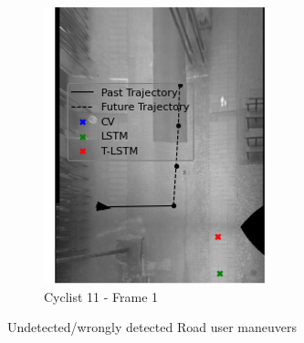 \documentclass{article}
\begin{document}
\begin{figure}[H]
\begin{subfigure}{0.40\textwidth}
  \includegraphics[width=\linewidth]{quali_results/cyc-11.png}
  \caption{Cyclist 11 - Frame 1}
  \label{fig:cyc11}
\end{subfigure}
\caption{Undetected/wrongly detected Road user maneuvers }
\label{fig:fails}
\end{figure}










\printbibliography %
\end{document}
